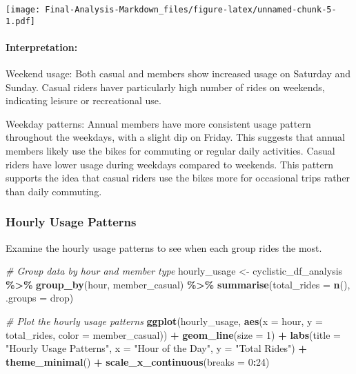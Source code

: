 \documentclass[
]{article}
\newenvironment{Shaded}{\begin{snugshade}}{\end{snugshade}}
\newcommand{\AttributeTok}[1]{\textcolor[rgb]{0.13,0.29,0.53}{#1}}
\newcommand{\CommentTok}[1]{\textcolor[rgb]{0.56,0.35,0.01}{\textit{#1}}}
\newcommand{\DecValTok}[1]{\textcolor[rgb]{0.00,0.00,0.81}{#1}}
\newcommand{\FunctionTok}[1]{\textcolor[rgb]{0.13,0.29,0.53}{\textbf{#1}}}
\newcommand{\NormalTok}[1]{#1}
\newcommand{\OtherTok}[1]{\textcolor[rgb]{0.56,0.35,0.01}{#1}}
\newcommand{\SpecialCharTok}[1]{\textcolor[rgb]{0.81,0.36,0.00}{\textbf{#1}}}
\newcommand{\StringTok}[1]{\textcolor[rgb]{0.31,0.60,0.02}{#1}}
\begin{document}
\texttt{[image: Final-Analysis-Markdown\_files/figure-latex/unnamed-chunk-5-1.pdf]}

\paragraph{Interpretation:}\label{interpretation-2}

Weekend usage: Both casual and members show increased usage on Saturday
and Sunday. Casual riders haver particularly high number of rides on
weekends, indicating leisure or recreational use.

Weekday patterns: Annual members have more consistent usage pattern
throughout the weekdays, with a slight dip on Friday. This suggests that
annual members likely use the bikes for commuting or regular daily
activities. Casual riders have lower usage during weekdays compared to
weekends. This pattern supports the idea that casual riders use the
bikes more for occasional trips rather than daily commuting.

\subsubsection{Hourly Usage Patterns}\label{hourly-usage-patterns}

Examine the hourly usage patterns to see when each group rides the most.

\begin{Shaded}
\begin{Highlighting}[]
\CommentTok{\# Group data by hour and member type}
\NormalTok{hourly\_usage }\OtherTok{\textless{}{-}}\NormalTok{ cyclistic\_df\_analysis }\SpecialCharTok{\%\textgreater{}\%}
  \FunctionTok{group\_by}\NormalTok{(hour, member\_casual) }\SpecialCharTok{\%\textgreater{}\%}
  \FunctionTok{summarise}\NormalTok{(}\AttributeTok{total\_rides =} \FunctionTok{n}\NormalTok{(), }\AttributeTok{.groups =} \StringTok{\textquotesingle{}drop\textquotesingle{}}\NormalTok{)}

\CommentTok{\# Plot the hourly usage patterns}
\FunctionTok{ggplot}\NormalTok{(hourly\_usage, }\FunctionTok{aes}\NormalTok{(}\AttributeTok{x =}\NormalTok{ hour, }\AttributeTok{y =}\NormalTok{ total\_rides, }\AttributeTok{color =}\NormalTok{ member\_casual)) }\SpecialCharTok{+}
  \FunctionTok{geom\_line}\NormalTok{(}\AttributeTok{size =} \DecValTok{1}\NormalTok{) }\SpecialCharTok{+}
  \FunctionTok{labs}\NormalTok{(}\AttributeTok{title =} \StringTok{"Hourly Usage Patterns"}\NormalTok{, }\AttributeTok{x =} \StringTok{"Hour of the Day"}\NormalTok{, }\AttributeTok{y =} \StringTok{"Total Rides"}\NormalTok{) }\SpecialCharTok{+}
  \FunctionTok{theme\_minimal}\NormalTok{() }\SpecialCharTok{+}
  \FunctionTok{scale\_x\_continuous}\NormalTok{(}\AttributeTok{breaks =} \DecValTok{0}\SpecialCharTok{:}\DecValTok{24}\NormalTok{)}
\end{Highlighting}
\end{Shaded}
\end{document}
